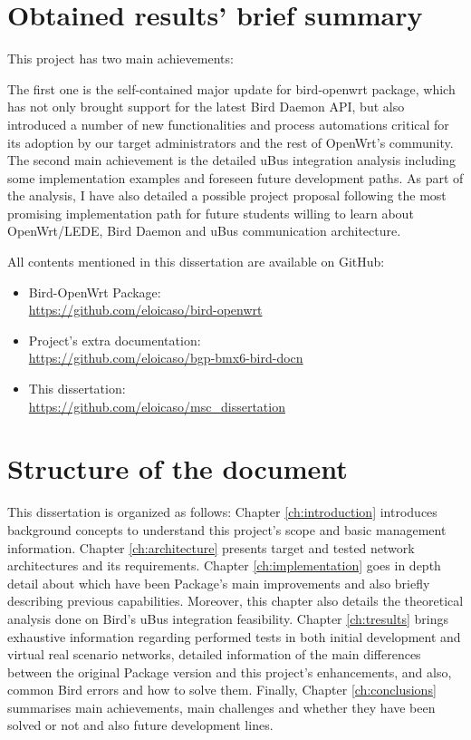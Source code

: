 \section{Obtained results' brief summary}
This project has two main achievements:

The first one is the self-contained major update for bird-openwrt package, which has not only brought support for the latest Bird Daemon API, but also introduced a number of new functionalities and process automations critical for its adoption by our target administrators and the rest of OpenWrt's community.
The second main achievement is the detailed uBus integration analysis including some implementation examples and foreseen future development paths. As part of the analysis, I have also detailed a possible project proposal following the most promising implementation path for future students willing to learn about OpenWrt/LEDE, Bird Daemon and uBus communication architecture.

All contents mentioned in this dissertation are available on GitHub:

\begin{itemize}
    \item Bird-OpenWrt Package: \\
    \href{https://github.com/eloicaso/bird-openwrt}{https://github.com/eloicaso/bird-openwrt}
    \item Project's extra documentation:\\
    \href{https://github.com/eloicaso/bgp-bmx6-bird-docn}{https://github.com/eloicaso/bgp-bmx6-bird-docn}
    \item This dissertation:\\
    \href{https://github.com/eloicaso/msc_dissertation}{https://github.com/eloicaso/msc\_dissertation}
\end{itemize}

\section{Structure of the document}
\label{sec:sod}
This dissertation is organized as follows: Chapter \ref{ch:introduction} introduces background concepts to understand this project's scope and basic management information. Chapter \ref{ch:architecture} presents target and tested network architectures and its requirements. Chapter \ref{ch:implementation} goes in depth detail about which have been Package's main improvements and also briefly describing previous capabilities. Moreover, this chapter also details the theoretical analysis done on Bird's uBus integration feasibility. Chapter \ref{ch:tresults} brings exhaustive information regarding performed tests in both initial development and virtual real scenario networks, detailed information of the main differences between the original Package version and this project's enhancements, and also, common Bird errors and how to solve them. Finally, Chapter \ref{ch:conclusions} summarises main achievements, main challenges and whether they have been solved or not and also future development lines. 

